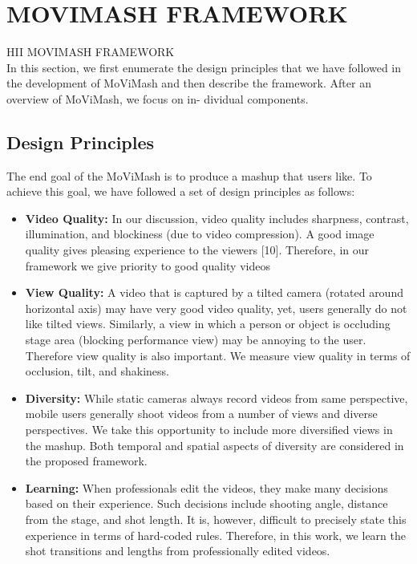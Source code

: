 \documentclass{sig-alternate}
\begin{document}
\section{MOVIMASH FRAMEWORK}
HII MOVIMASH FRAMEWORK\\

In this section, we first enumerate the design principles that we
have followed in the development of MoViMash and then describe
the framework. After an overview of MoViMash, we focus on in-
dividual components.



\subsection{Design Principles}
The end goal of the MoViMash is to produce a mashup that users
like. To achieve this goal, we have followed a set of design principles as follows:

\begin{itemize}
\item \textbf{Video Quality:} In our discussion, video quality includes
sharpness, contrast, illumination, and blockiness (due to video
compression). A good image quality gives pleasing experience to the viewers [10]. Therefore, in our framework we
give priority to good quality videos

\item \textbf{View Quality:} A video that is captured by a tilted camera
(rotated around horizontal axis) may have very good video
quality, yet, users generally do not like tilted views. Similarly, a view in which a person or object is occluding stage
area (blocking performance view) may be annoying to the
user. Therefore view quality is also important. We measure
view quality in terms of occlusion, tilt, and shakiness.




\item \textbf{Diversity:} While static cameras always record videos from
same perspective, mobile users generally shoot videos from
a number of views and diverse perspectives. We take this
opportunity to include more diversified views in the mashup.
Both temporal and spatial aspects of diversity are considered
in the proposed framework.

\item \textbf{Learning:} When professionals edit the videos, they make
many decisions based on their experience. Such decisions
include shooting angle, distance from the stage, and shot
length. It is, however, difficult to precisely state this experience in terms of hard-coded rules. Therefore, in this work,
we learn the shot transitions and lengths from professionally
edited videos.

\end{itemize}
\end{document}
